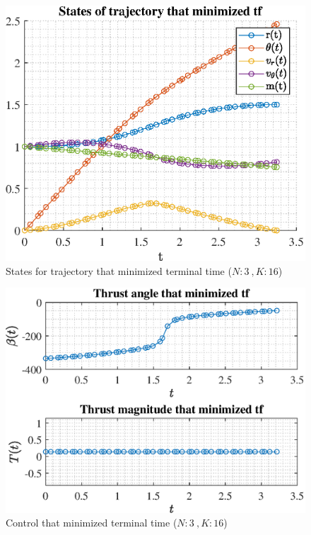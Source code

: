 \documentclass[]{article}
\begin{document}
	\begin{figure}
		\centering
		\includegraphics[scale=0.75]{states_N3_K16_C2_tf.eps}
		\caption{States for trajectory that minimized terminal time (\(N:3\ , K:16\))}
		\label{fig:states_N3_K16_C2_tf}
	\end{figure}
	\begin{figure}
		\centering
		\includegraphics[scale=0.75]{control_N3_K16_C2_tf.eps}
		\caption{Control that minimized terminal time (\(N:3\ , K:16\))}
		\label{fig:control_N3_K16_C2_tf}
	\end{figure}
\end{document}
